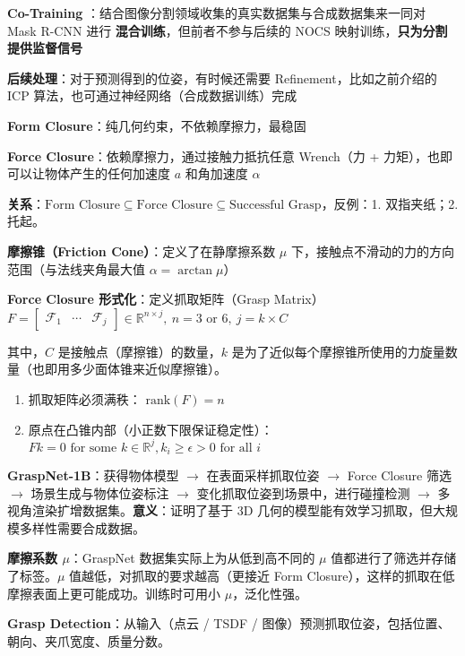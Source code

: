 \documentclass[
  8pt]{extarticle}
\providecommand{\tightlist}{%
  \setlength{\itemsep}{0pt}\setlength{\parskip}{0pt}}
\begin{document}
\begin{multicols*}{4}
\textbf{Co-Training}
：结合图像分割领域收集的真实数据集与合成数据集来一同对 Mask R-CNN 进行
\textbf{混合训练}，但前者不参与后续的 NOCS
映射训练，\textbf{只为分割提供监督信号}

\textbf{后续处理}：对于预测得到的位姿，有时候还需要
Refinement，比如之前介绍的 ICP
算法，也可通过神经网络（合成数据训练）完成

\textbf{Form Closure}：纯几何约束，不依赖摩擦力，最稳固

\textbf{Force Closure}：依赖摩擦力，通过接触力抵抗任意 Wrench（力 +
力矩），也即可以让物体产生的任何加速度 \(a\) 和角加速度 \(\alpha\)

\textbf{关系}：\(\text{Form Closure} \subseteq \text{Force Closure} \subseteq \text{Successful Grasp}\)，反例：1.
双指夹纸；2. 托起。

\textbf{摩擦锥（Friction Cone）}：定义了在静摩擦系数 \(\mu\)
下，接触点不滑动的力的方向范围（与法线夹角最大值
\(\alpha = \arctan \mu\)）

\textbf{Force Closure 形式化}：定义抓取矩阵（Grasp
Matrix）\(F = \begin{bmatrix} \mathcal{F}_1 & \cdots & \mathcal{F}_j \end{bmatrix} \in \mathbb{R}^{n \times j},\ n = 3 \text{ or } 6,\ j = k \times C\)

其中，\(C\) 是接触点（摩擦锥）的数量，\(k\)
是为了近似每个摩擦锥所使用的力旋量数量（也即用多少面体锥来近似摩擦锥）。

\begin{enumerate}
\def\labelenumi{\arabic{enumi}.}
\tightlist
\item
  抓取矩阵必须满秩： \(\text{rank}(F)=n\)
\item
  原点在凸锥内部（小正数下限保证稳定性）：\(Fk = 0 \text{ for some } k \in \mathbb{R}^j, k_i \ge \epsilon > 0 \text{ for all } i\)
\end{enumerate}

\textbf{GraspNet-1B}：获得物体模型 \(\to\) 在表面采样抓取位姿 \(\to\)
Force Closure 筛选 \(\to\) 场景生成与物体位姿标注 \(\to\)
变化抓取位姿到场景中，进行碰撞检测 \(\to\)
多视角渲染扩增数据集。\textbf{意义}：证明了基于 3D
几何的模型能有效学习抓取，但大规模多样性需要合成数据。

\textbf{摩擦系数 \(\mu\)}：GraspNet 数据集实际上为从低到高不同的 \(\mu\)
值都进行了筛选并存储了标签。\(\mu\) 值越低，对抓取的要求越高（更接近
Form Closure），这样的抓取在低摩擦表面上更可能成功。训练时可用小
\(\mu\)，泛化性强。

\textbf{Grasp Detection}：从输入（点云 / TSDF /
图像）预测抓取位姿，包括位置、朝向、夹爪宽度、质量分数。


\end{multicols*}
\end{document}
